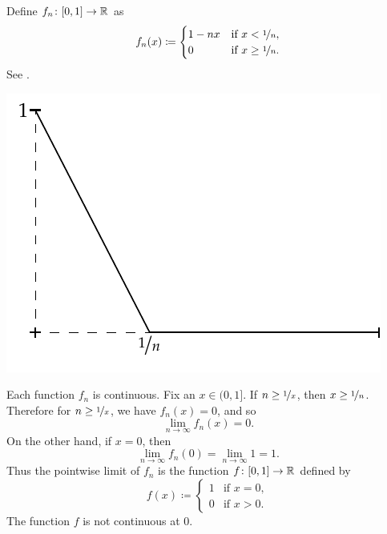 \begin{example}
Define $f_n \colon [0,1] \to {\mathbb{R}}$ as
\begin{equation*}
f_n(x) \coloneqq
\begin{cases}
1-nx &  \text{if } x < \nicefrac{1}{n},\\
0 &  \text{if } x \geq \nicefrac{1}{n}.
\end{cases}
\end{equation*}
See .

\begin{myfigureht}
\includegraphics{figures/contconvcntr}
\caption{Graph of $f_n(x)$.%
\label{contconvcntr:fig}}
\end{myfigureht}

Each function $f_n$ is continuous.
Fix an $x \in (0,1]$.  If $n \geq \nicefrac{1}{x}$,
then $x \geq \nicefrac{1}{n}$.  Therefore for $n \geq \nicefrac{1}{x}$,
we have $f_n(x) = 0$, and so
\begin{equation*}
\lim_{n \to \infty} f_n(x) = 0.
\end{equation*}
On the other hand, if $x=0$, then
\begin{equation*}
\lim_{n \to \infty} f_n(0) = 
\lim_{n \to \infty} 1 = 1.
\end{equation*}
Thus the pointwise limit of $f_n$ is the function
$f \colon [0,1] \to {\mathbb{R}}$ defined by
\begin{equation*}
f(x) \coloneqq
\begin{cases}
1 &  \text{if } x = 0,\\
0 &  \text{if } x > 0.
\end{cases}
\end{equation*}
The function $f$ is not continuous at 0.
\end{example}


